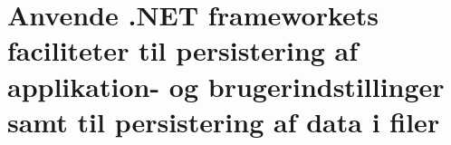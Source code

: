 \section{Anvende .NET frameworkets faciliteter til persistering af applikation- og brugerindstillinger samt til persistering af data i filer}\label{sec:spm6}

